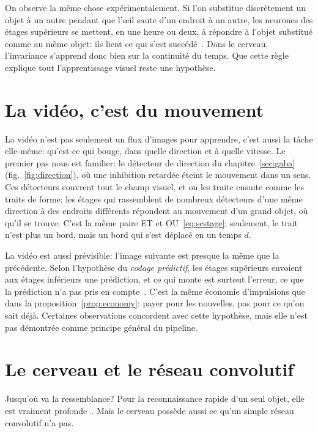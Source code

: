On observe la même chose expérimentalement. Si l'on substitue discrètement un objet à un autre pendant que l'œil saute d'un endroit à un autre, les neurones des étages supérieurs se mettent, en une heure ou deux, à répondre à l'objet substitué comme au même objet: ils lient ce qui s'est succédé~\cite{LiDiCarlo2008}. Dans le cerveau, l'invariance s'apprend donc bien sur la continuité du temps. Que cette règle explique tout l'apprentissage visuel reste une hypothèse.

\section{La vidéo, c'est du mouvement}

La vidéo n'est pas seulement un flux d'images pour apprendre, c'est aussi la tâche elle-même: qu'est-ce qui bouge, dans quelle direction et à quelle vitesse. Le premier pas nous est familier: le détecteur de direction du chapitre~\ref{sec:gaba} (fig.~\ref{fig:direction}), où une inhibition retardée éteint le mouvement dans un sens. Ces détecteurs couvrent tout le champ visuel, et on les traite ensuite comme les traits de forme: les étages qui rassemblent de nombreux détecteurs d'une même direction à des endroits différents répondent au mouvement d'un grand objet, où qu'il se trouve. C'est la même paire ET et OU~\eqref{eq:scstage}; seulement, le trait n'est plus \og un bord\fg{}, mais \og un bord qui s'est déplacé en un temps $d$\fg{}.

La vidéo est aussi prévisible: l'image suivante est presque la même que la précédente. Selon l'hypothèse du \emph{codage prédictif}, les étages supérieurs envoient aux étages inférieurs une prédiction, et ce qui monte est surtout l'erreur, ce que la prédiction n'a pas pris en compte~\cite{RaoBallard1999}. C'est la même économie d'impulsions que dans la proposition~\ref{prop:economy}: payer pour les nouvelles, pas pour ce qu'on sait déjà. Certaines observations concordent avec cette hypothèse, mais elle n'est pas démontrée comme principe général du pipeline.

\section{Le cerveau et le réseau convolutif}

Jusqu'où va la ressemblance? Pour la reconnaissance rapide d'un seul objet, elle est vraiment profonde~\cite{Yamins2014}. Mais le cerveau possède aussi ce qu'un simple réseau convolutif n'a pas.

